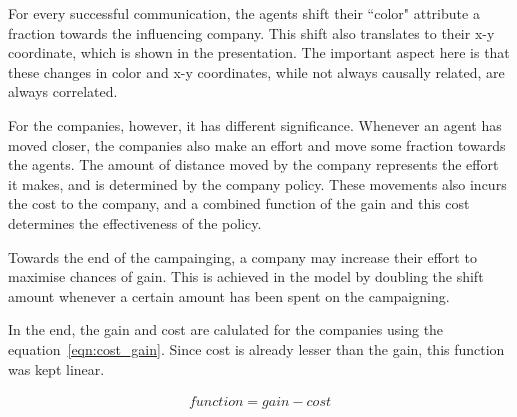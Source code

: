 For every successful communication, the agents shift their ``color" attribute a fraction towards the influencing company. This shift also translates to their x-y coordinate, which is shown in the presentation. The important aspect here is that these changes in color and x-y coordinates, while not always causally related, are always correlated. 

For the companies, however, it has different significance. Whenever an agent has moved closer, the companies also make an effort and move some fraction towards the agents. The amount of distance moved by the company represents the effort it makes, and is determined by the company policy. These movements also incurs the cost to the company, and a combined function of the gain and this cost determines the effectiveness of the policy.

Towards the end of the campainging, a company may increase their effort to maximise chances of gain. This is achieved in the model by doubling the shift amount whenever a certain amount has been spent on the campaigning.


In the end, the gain and cost are calulated for the companies using the equation~\ref{eqn:cost_gain}. Since cost is already lesser than the gain, this function was kept linear.

\begin{eqnarray}
function = gain - cost \\
\label{eqn:cost_gain}
\end{eqnarray}



